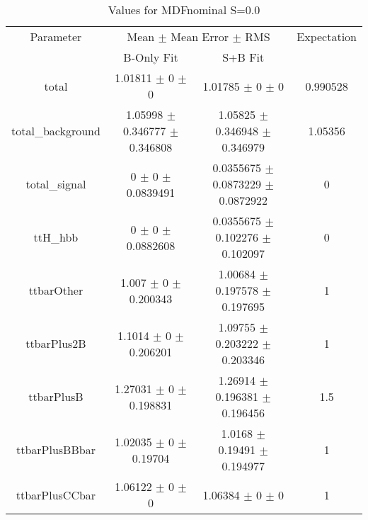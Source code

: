 \begin{table}
\centering
\caption{Values for MDFnominal S=0.0}
\begin{tabular}{cccc}
\toprule
Parameter & \multicolumn{2}{c}{Mean $\pm$ Mean Error $\pm$ RMS} & Expectation\\
 & B-Only Fit & S+B Fit & \\
\midrule
total & \num{1.01811} $\pm$ \num{0} $\pm$ \num{0} & \num{1.01785} $\pm$ \num{0} $\pm$ \num{0} & \num{0.990528}\\
total\_background & \num{1.05998} $\pm$ \num{0.346777} $\pm$ \num{0.346808} & \num{1.05825} $\pm$ \num{0.346948} $\pm$ \num{0.346979} & \num{1.05356}\\
total\_signal & \num{0} $\pm$ \num{0} $\pm$ \num{0.0839491} & \num{0.0355675} $\pm$ \num{0.0873229} $\pm$ \num{0.0872922} & \num{0}\\
ttH\_hbb & \num{0} $\pm$ \num{0} $\pm$ \num{0.0882608} & \num{0.0355675} $\pm$ \num{0.102276} $\pm$ \num{0.102097} & \num{0}\\
ttbarOther & \num{1.007} $\pm$ \num{0} $\pm$ \num{0.200343} & \num{1.00684} $\pm$ \num{0.197578} $\pm$ \num{0.197695} & \num{1}\\
ttbarPlus2B & \num{1.1014} $\pm$ \num{0} $\pm$ \num{0.206201} & \num{1.09755} $\pm$ \num{0.203222} $\pm$ \num{0.203346} & \num{1}\\
ttbarPlusB & \num{1.27031} $\pm$ \num{0} $\pm$ \num{0.198831} & \num{1.26914} $\pm$ \num{0.196381} $\pm$ \num{0.196456} & \num{1.5}\\
ttbarPlusBBbar & \num{1.02035} $\pm$ \num{0} $\pm$ \num{0.19704} & \num{1.0168} $\pm$ \num{0.19491} $\pm$ \num{0.194977} & \num{1}\\
ttbarPlusCCbar & \num{1.06122} $\pm$ \num{0} $\pm$ \num{0} & \num{1.06384} $\pm$ \num{0} $\pm$ \num{0} & \num{1}\\
\bottomrule
\end{tabular}
\end{table}